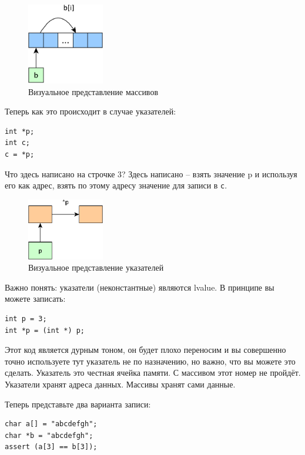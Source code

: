 \documentclass[a4paper,12pt,oneside]{article}
\begin{document}
\begin{figure}[h!]
\centering
\includegraphics[width=0.3\textwidth]{illustrations/arrays-crop.pdf}
\caption{Визуальное представление массивов}
\label{fig:arrays-crop}
\end{figure}

Теперь как это происходит в случае указателей:

\begin{lstlisting}
int *p;
int c;
c = *p;
\end{lstlisting}

Что здесь написано на строчке 3? Здесь написано – взять значение p и используя его как адрес, взять по этому адресу значение для записи в \lstinline!c!.

\begin{figure}[h!]
\centering
\includegraphics[width=0.3\textwidth]{illustrations/pointers-crop.pdf}
\caption{Визуальное представление указателей}
\label{fig:pointers-crop}
\end{figure}

Важно понять: указатели (неконстантные) являются lvalue. В принципе вы можете записать:

\begin{lstlisting}
int p = 3;
int *p = (int *) p;
\end{lstlisting}

Этот код является дурным тоном, он будет плохо переносим и вы совершенно точно используете тут указатель не по назначению, но важно, что вы можете это сделать. Указатель это честная ячейка памяти. С массивом этот номер не пройдёт. Указатели хранят адреса данных. Массивы хранят сами данные.

Теперь представьте два варианта записи:

\begin{lstlisting}
char a[] = "abcdefgh";
char *b = "abcdefgh";
assert (a[3] == b[3]);
\end{lstlisting}
\end{document}
